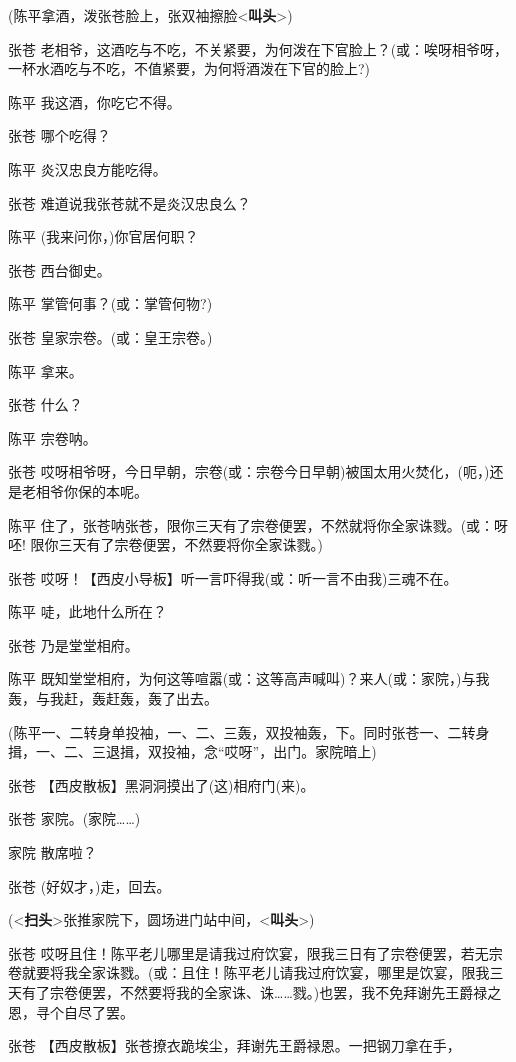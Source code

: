 (陈平拿酒，泼张苍脸上，张双袖擦脸\textless{}\textbf{叫头}\textgreater{})

张苍
老相爷，这酒吃与不吃，不关紧要，为何泼在下官脸上？(或：唉呀相爷呀，一杯水酒吃与不吃，不值紧要，为何将酒泼在下官的脸上?)

陈平 我这酒，你吃它不得。

张苍 哪个吃得？

陈平 炎汉忠良方能吃得。

张苍 难道说我张苍就不是炎汉忠良么？

陈平 (我来问你，)你官居何职？

张苍 西台御史。

陈平 掌管何事？(或：掌管何物?)

张苍 皇家宗卷。(或：皇王宗卷。)

陈平 拿来。

张苍 什么？

陈平 宗卷呐。

张苍
哎呀相爷呀，今日早朝，宗卷(或：宗卷今日早朝)被国太用火焚化，(呃，)还是老相爷你保的本呢。

陈平
住了，张苍呐张苍，限你三天有了宗卷便罢，不然就将你全家诛戮。(或：呀呸!
限你三天有了宗卷便罢，不然要将你全家诛戮。)

张苍 哎呀！【西皮小导板】听一言吓得我(或：听一言不由我)三魂不在。

陈平 唗，此地什么所在？

张苍 乃是堂堂相府。

陈平
既知堂堂相府，为何这等喧嚣(或：这等高声喊叫)？来人(或：家院，)与我轰，与我赶，轰赶轰，轰了出去。

(陈平一、二转身单投袖，一、二、三轰，双投袖轰，下。同时张苍一、二转身揖，一、二、三退揖，双投袖，念``哎呀''，出门。家院暗上)

张苍 【西皮散板】黑洞洞摸出了(这)相府门(来)。

张苍 家院。(家院\ldots{}\ldots{})

家院 散席啦？

张苍 (好奴才，)走，回去。

(\textless{}\textbf{扫头}\textgreater{}张推家院下，圆场进门站中间，\textless{}\textbf{叫头}\textgreater{})

张苍
哎呀且住！陈平老儿哪里是请我过府饮宴，限我三日有了宗卷便罢，若无宗卷就要将我全家诛戮。(或：且住！陈平老儿请我过府饮宴，哪里是饮宴，限我三天有了宗卷便罢，不然要将我的全家诛、诛\ldots{}\ldots{}戮。)也罢，我不免拜谢先王爵禄之恩，寻个自尽了罢。

张苍 【西皮散板】张苍撩衣跪埃尘，拜谢先王爵禄恩。一把钢刀拿在手，

